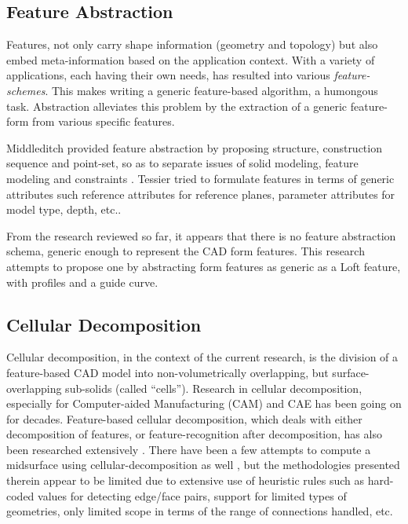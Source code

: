 \subsection{Feature Abstraction}
Features, not only carry shape information (geometry and topology) but also embed meta-information based on the application context. With a variety of applications, each having their own needs,  has resulted into various {\em feature-schemes}.  This makes writing a  generic feature-based algorithm, a humongous task. Abstraction alleviates this problem by the extraction of a generic feature-form from various specific features. 
 
  Middleditch  provided feature abstraction by proposing structure, construction sequence and point-set, so as to separate issues of  solid modeling, feature modeling and constraints \cite{Middleditch1997}.  Tessier tried to formulate features in terms of generic attributes such reference attributes for reference planes, parameter attributes for model type, depth, etc.\cite{Tessier2013}. 
  
From the research reviewed so far, it appears that there is no feature abstraction schema, generic enough to represent the CAD form features. This research attempts to propose one by  abstracting form features as generic as a Loft feature, with profiles and a guide curve.
  
 \subsection{Cellular Decomposition}
 
Cellular decomposition, in the context of the current research, is the division of a feature-based CAD model into non-volumetrically overlapping, but surface-overlapping sub-solids (called ``cells'').  Research in  cellular decomposition, especially for Computer-aided Manufacturing (CAM) and CAE has been going on for decades. Feature-based cellular decomposition, which deals with either decomposition of features, or feature-recognition after decomposition,  has also been  researched extensively \cite{Bidarra1993, BidarraKrakerBronsvoort1998, Woo2003, JaeLee2004, Treeck, Boussuge2013a, Wu2014, Woo2014}. There have been a few attempts to compute a midsurface using cellular-decomposition as well \cite{Chong2004, Woo2013, Boussuge2013, Zhu2015}, but the methodologies presented therein appear to be limited due to extensive use of heuristic rules such as hard-coded values for detecting edge/face pairs, support for limited types of geometries, only limited scope in terms of the range of connections  handled, etc.


